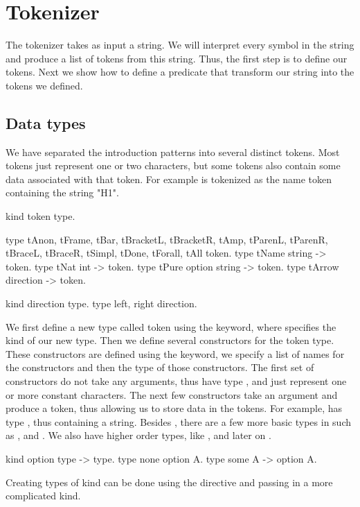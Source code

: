 \documentclass[thesis.tex]{subfiles}
\begin{document}
\section{Tokenizer}\label{ssec:tokenizer}
The tokenizer takes as input a string. We will interpret every symbol in the string and produce a list of tokens from this string. Thus, the first step is to define our tokens. Next we show how to define a predicate that transform our string into the tokens we defined.

\subsection{Data types}\label{sssec:datatypes}
We have separated the introduction patterns into several distinct tokens. Most tokens just represent one or two characters, but some tokens also contain some data associated with that token. For example  is tokenized as the name token containing the string "H1".
\begin{elpicode}
  kind token type.

  type tAnon, tFrame, tBar, tBracketL, tBracketR, tAmp,
       tParenL, tParenR, tBraceL, tBraceR, tSimpl,
       tDone, tForall, tAll token.
  type tName string -> token.
  type tNat int -> token.
  type tPure option string -> token.
  type tArrow direction -> token.

  kind direction type.
  type left, right direction.
\end{elpicode}
We first define a new type called token using the  keyword, where  specifies the kind of our new type. Then we define several constructors for the token type. These constructors are defined using the  keyword, we specify a list of names for the constructors and then the type of those constructors. The first set of constructors do not take any arguments, thus have type , and just represent one or more constant characters. The next few constructors take an argument and produce a token, thus allowing us to store data in the tokens. For example,  has type , thus containing a string. Besides , there are a few more basic types in \elpi such as ,  and . We also have higher order types, like , and later on .
\begin{elpicode}
  kind option type -> type.
  type none option A.
  type some A -> option A.
\end{elpicode}
Creating types of kind  can be done using the  directive and passing in a more complicated kind.
\end{document}
